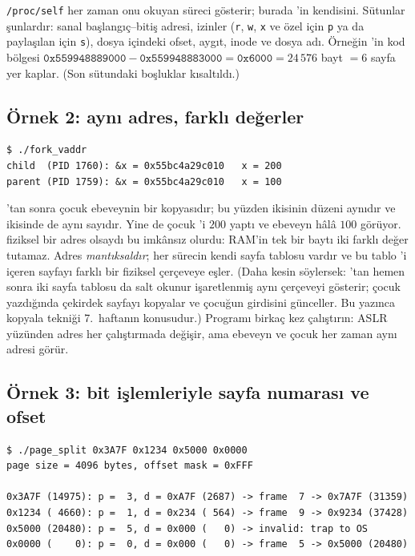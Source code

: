 \texttt{/proc/self} her zaman onu okuyan süreci gösterir; burada 'in kendisini. Sütunlar şunlardır: sanal başlangıç--bitiş adresi, izinler (\texttt{r}, \texttt{w}, \texttt{x} ve özel için \texttt{p} ya da paylaşılan için \texttt{s}), dosya içindeki ofset, aygıt, inode ve dosya adı. Örneğin 'in kod bölgesi $\texttt{0x559948889000} - \texttt{0x559948883000} = \texttt{0x6000} = 24\,576$ bayt $= 6$ sayfa yer kaplar. (Son sütundaki boşluklar kısaltıldı.)

\subsection{Örnek 2: aynı adres, farklı değerler}



\begin{lstlisting}[style=term]
$ ./fork_vaddr
child  (PID 1760): &x = 0x55bc4a29c010   x = 200
parent (PID 1759): &x = 0x55bc4a29c010   x = 100
\end{lstlisting}

'tan sonra çocuk ebeveynin bir kopyasıdır; bu yüzden ikisinin düzeni aynıdır ve  ikisinde de aynı sayıdır. Yine de çocuk 'i $200$ yaptı ve ebeveyn hâlâ $100$ görüyor.  fiziksel bir adres olsaydı bu imkânsız olurdu: RAM'in tek bir baytı iki farklı değer tutamaz. Adres \emph{mantıksaldır}; her sürecin kendi sayfa tablosu vardır ve bu tablo 'i içeren sayfayı farklı bir fiziksel çerçeveye eşler. (Daha kesin söylersek: 'tan hemen sonra iki sayfa tablosu da salt okunur işaretlenmiş aynı çerçeveyi gösterir; çocuk yazdığında çekirdek sayfayı kopyalar ve çocuğun girdisini günceller. Bu yazınca kopyala tekniği 7.~haftanın konusudur.) Programı birkaç kez çalıştırın: ASLR yüzünden adres her çalıştırmada değişir, ama ebeveyn ve çocuk her zaman aynı adresi görür.

\subsection{Örnek 3: bit işlemleriyle sayfa numarası ve ofset}



\begin{lstlisting}[style=term]
$ ./page_split 0x3A7F 0x1234 0x5000 0x0000
page size = 4096 bytes, offset mask = 0xFFF

0x3A7F (14975): p =  3, d = 0xA7F (2687) -> frame  7 -> 0x7A7F (31359)
0x1234 ( 4660): p =  1, d = 0x234 ( 564) -> frame  9 -> 0x9234 (37428)
0x5000 (20480): p =  5, d = 0x000 (   0) -> invalid: trap to OS
0x0000 (    0): p =  0, d = 0x000 (   0) -> frame  5 -> 0x5000 (20480)
\end{lstlisting}

